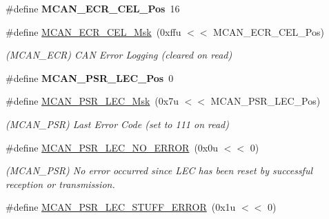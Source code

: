 \begin{DoxyCompactItemize}
\mbox{\label{group__SAMV71__MCAN_gaf00f150181ed3603bfe6f31197f680d4}} 
\#define {\bfseries M\+C\+A\+N\+\_\+\+E\+C\+R\+\_\+\+C\+E\+L\+\_\+\+Pos}~16
\item 
\mbox{\label{group__SAMV71__MCAN_ga3c451715946bb69ac78d53442f03996e}} 
\#define \mbox{\hyperlink{group__SAMV71__MCAN_ga3c451715946bb69ac78d53442f03996e}{M\+C\+A\+N\+\_\+\+E\+C\+R\+\_\+\+C\+E\+L\+\_\+\+Msk}}~(0xffu $<$$<$ M\+C\+A\+N\+\_\+\+E\+C\+R\+\_\+\+C\+E\+L\+\_\+\+Pos)
\begin{DoxyCompactList}\small\item\em (M\+C\+A\+N\+\_\+\+E\+CR) C\+AN Error Logging (cleared on read) \end{DoxyCompactList}\item 
\mbox{\label{group__SAMV71__MCAN_gaf690ae415b38f55f546e132ef87a0459}} 
\#define {\bfseries M\+C\+A\+N\+\_\+\+P\+S\+R\+\_\+\+L\+E\+C\+\_\+\+Pos}~0
\item 
\mbox{\label{group__SAMV71__MCAN_ga7f316fbd021ba7c4cda00f5ac85b28d1}} 
\#define \mbox{\hyperlink{group__SAMV71__MCAN_ga7f316fbd021ba7c4cda00f5ac85b28d1}{M\+C\+A\+N\+\_\+\+P\+S\+R\+\_\+\+L\+E\+C\+\_\+\+Msk}}~(0x7u $<$$<$ M\+C\+A\+N\+\_\+\+P\+S\+R\+\_\+\+L\+E\+C\+\_\+\+Pos)
\begin{DoxyCompactList}\small\item\em (M\+C\+A\+N\+\_\+\+P\+SR) Last Error Code (set to 111 on read) \end{DoxyCompactList}\item 
\mbox{\label{group__SAMV71__MCAN_ga0b3958e9c008b0a3239832b7d16dc492}} 
\#define \mbox{\hyperlink{group__SAMV71__MCAN_ga0b3958e9c008b0a3239832b7d16dc492}{M\+C\+A\+N\+\_\+\+P\+S\+R\+\_\+\+L\+E\+C\+\_\+\+N\+O\+\_\+\+E\+R\+R\+OR}}~(0x0u $<$$<$ 0)
\begin{DoxyCompactList}\small\item\em (M\+C\+A\+N\+\_\+\+P\+SR) No error occurred since L\+EC has been reset by successful reception or transmission. \end{DoxyCompactList}\item 
\mbox{\label{group__SAMV71__MCAN_gac7babae866116e7ac939bd5efa3e92c1}} 
\#define \mbox{\hyperlink{group__SAMV71__MCAN_gac7babae866116e7ac939bd5efa3e92c1}{M\+C\+A\+N\+\_\+\+P\+S\+R\+\_\+\+L\+E\+C\+\_\+\+S\+T\+U\+F\+F\+\_\+\+E\+R\+R\+OR}}~(0x1u $<$$<$ 0)

\end{DoxyCompactItemize}
